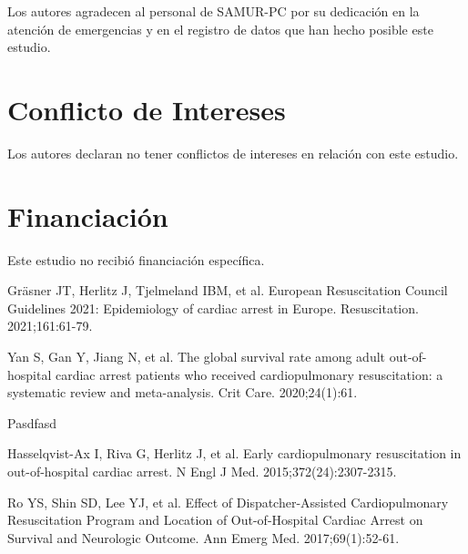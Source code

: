 \documentclass[10pt,a4paper]{article}
\begin{document}
\begin{multicols}{2}
Los autores agradecen al personal de SAMUR-PC por su dedicación en la atención de emergencias y en el registro de datos que han hecho posible este estudio.

\section{Conflicto de Intereses}

Los autores declaran no tener conflictos de intereses en relación con este estudio.

\section{Financiación}

Este estudio no recibió financiación específica.

\begin{thebibliography}{99}

 Gräsner JT, Herlitz J, Tjelmeland IBM, et al. European Resuscitation Council Guidelines 2021: Epidemiology of cardiac arrest in Europe. Resuscitation. 2021;161:61-79.

 Yan S, Gan Y, Jiang N, et al. The global survival rate among adult out-of-hospital cardiac arrest patients who received cardiopulmonary resuscitation: a systematic review and meta-analysis. Crit Care. 2020;24(1):61.

 Pasdfasd

 Hasselqvist-Ax I, Riva G, Herlitz J, et al. Early cardiopulmonary resuscitation in out-of-hospital cardiac arrest. N Engl J Med. 2015;372(24):2307-2315.

 Ro YS, Shin SD, Lee YJ, et al. Effect of Dispatcher-Assisted Cardiopulmonary Resuscitation Program and Location of Out-of-Hospital Cardiac Arrest on Survival and Neurologic Outcome. Ann Emerg Med. 2017;69(1):52-61.

\end{thebibliography}

\end{multicols}
\end{document}
